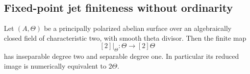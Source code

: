 \subsection{Fixed-point jet finiteness without ordinarity}
\label{subsec:nonordinary-ppav-fixed-jets-candidate}

\begin{lemma}
\label{lem:all-theta-double-image-candidate}
Let $(A,\Theta)$ be a principally polarized abelian surface
over an algebraically closed field of characteristic two,
with smooth theta divisor. Then the finite map
\[
                         [2]|_\Theta:\Theta\longrightarrow[2]\Theta
\]
has inseparable degree two and separable degree one. In
particular its reduced image is numerically equivalent to
$2\Theta$.
\end{lemma}
